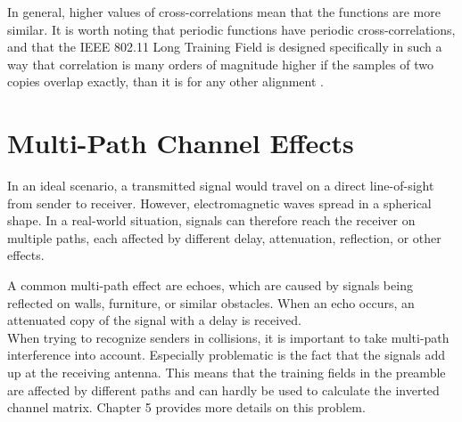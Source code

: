 In general, higher values of cross-correlations mean that the functions are more similar. It is worth noting that periodic functions have periodic cross-correlations, and that the \gls{IEEE} 802.11 Long Training Field is designed specifically in such a way that correlation is many orders of magnitude higher if the samples of two copies overlap exactly, than it is for any other alignment \cite{perahia2013}.



\section{Multi-Path Channel Effects}\label{sec:multipath}

In an ideal scenario, a transmitted signal would travel on a direct line-of-sight from sender to receiver. However, electromagnetic waves spread in a spherical shape. In a real-world situation, signals can therefore reach the receiver on multiple paths, each affected by different delay, attenuation, reflection, or other effects.

A common multi-path effect are echoes, which are caused by signals being reflected on walls, furniture, or similar obstacles. When an echo occurs, an attenuated copy of the signal with a delay is received.\\

When trying to recognize senders in collisions, it is important to take multi-path interference into account. Especially problematic is the fact that the signals add up at the receiving antenna. This means that the training fields in the preamble are affected by different paths and can hardly be used to calculate the inverted channel matrix. Chapter 5 provides more details on this problem.
